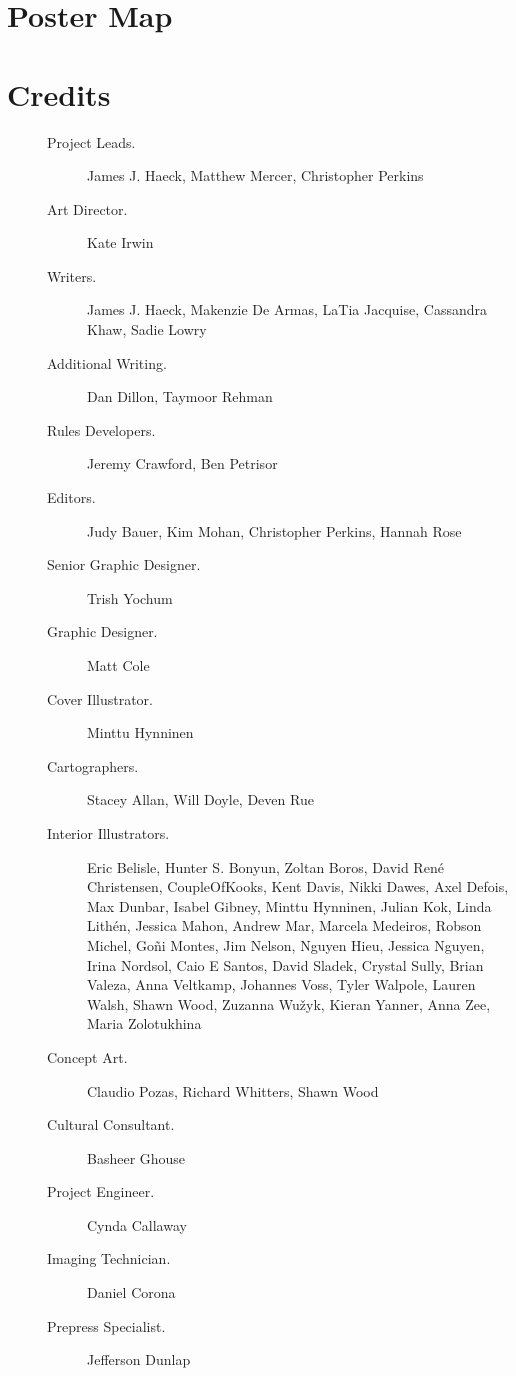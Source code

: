 \documentclass[letterpaper, 11pt, bg=full, twocolumn]{dndbook}
\begin{document}
\chapter{Poster Map}\label{ch:poster-map-14-14}


\chapter{Credits}\label{ch:credits-15-15}

\begin{description}
\item[\mbox{}] \begin{description}
\item[Project Leads.] James J. Haeck, Matthew Mercer, Christopher Perkins
\item[Art Director.] Kate Irwin
\item[Writers.] James J. Haeck, Makenzie De Armas, LaTia Jacquise, Cassandra Khaw, Sadie Lowry
\item[Additional Writing.] Dan Dillon, Taymoor Rehman
\item[Rules Developers.] Jeremy Crawford, Ben Petrisor
\item[Editors.] Judy Bauer, Kim Mohan, Christopher Perkins, Hannah Rose
\item[Senior Graphic Designer.] Trish Yochum
\item[Graphic Designer.] Matt Cole
\item[Cover Illustrator.] Minttu Hynninen
\item[Cartographers.] Stacey Allan, Will Doyle, Deven Rue
\item[Interior Illustrators.] Eric Belisle, Hunter S. Bonyun, Zoltan Boros, David René Christensen, CoupleOfKooks, Kent Davis, Nikki Dawes, Axel Defois, Max Dunbar, Isabel Gibney, Minttu Hynninen, Julian Kok, Linda Lithén, Jessica Mahon, Andrew Mar, Marcela Medeiros, Robson Michel, Goñi Montes, Jim Nelson, Nguyen Hieu, Jessica Nguyen, Irina Nordsol, Caio E Santos, David Sladek, Crystal Sully, Brian Valeza, Anna Veltkamp, Johannes Voss, Tyler Walpole, Lauren Walsh, Shawn Wood, Zuzanna Wužyk, Kieran Yanner, Anna Zee, Maria Zolotukhina
\item[Concept Art.] Claudio Pozas, Richard Whitters, Shawn Wood
\item[Cultural Consultant.] Basheer Ghouse
\item[Project Engineer.] Cynda Callaway
\item[Imaging Technician.] Daniel Corona
\item[Prepress Specialist.] Jefferson Dunlap
\end{description}
\end{description}
\end{document}
